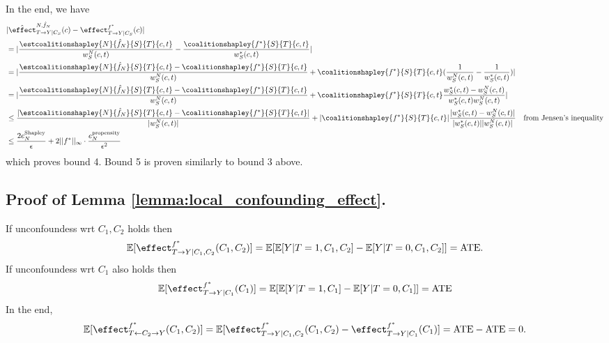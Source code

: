 In the end, we have
\begin{align*}
   &|\hat{\effect}^{N,\hat{f}_N}_{ T \rightarrow Y | C_S}(c)  - \effect^{f^*}_{ T \rightarrow Y | C_S}(c)|\\
   &=  | \frac{\estcoalitionshapley{N}{\hat{f}_N}{S}{T}{c,t}}{w^N_S(c,t)} - \frac{\coalitionshapley{f^*}{S}{T}{c,t}}{w^*_S(c,t)} | \\
   &= | \frac{\estcoalitionshapley{N}{\hat{f}_N}{S}{T}{c,t} - \coalitionshapley{f^*}{S}{T}{c,t}}{w^N_S(c,t)} + \coalitionshapley{f^*}{S}{T}{c,t}(\frac{1}{w^N_S(c,t)}-\frac{1}{w^*_S(c,t)}) | \\
    &= | \frac{\estcoalitionshapley{N}{\hat{f}_N}{S}{T}{c,t} - \coalitionshapley{f^*}{S}{T}{c,t}}{w^N_S(c,t)} + \coalitionshapley{f^*}{S}{T}{c,t}\frac{w^*_S(c,t) - w^N_S(c,t)}{w^*_S(c,t) w^N_S(c,t)} | \\
    &\leq \frac{|\estcoalitionshapley{N}{\hat{f}_N}{S}{T}{c,t} - \coalitionshapley{f^*}{S}{T}{c,t}|}{|w^N_S(c,t)|} + |\coalitionshapley{f^*}{S}{T}{c,t}|\frac{|w^*_S(c,t) - w^N_S(c,t)|}{|w^*_S(c,t)| |w^N_S(c,t)|}  \ \  \ \text{from Jensen's inequality} \\
    &\leq \frac{2e^\text{Shapley}_N}{\epsilon} + 2||f^*||_\infty \cdot \frac{e^\text{propensity}_N}{\epsilon^2}
\end{align*}
which proves bound 4. Bound 5 is proven similarly to bound 3 above.



\subsection{Proof of Lemma \ref{lemma:local_confounding_effect}.}

\label{proof:local_confounding_effect}
If unconfoundess wrt $C_1, C_2$ holds then
\begin{align*}
    \mathbb{E}[\effect^{f^*}_{T \rightarrow Y | C_1, C_2}(C_1, C_2)] = \mathbb{E}[\mathbb{E}[Y|T=1,C_1,C_2] - \mathbb{E}[Y|T=0,C_1,C_2]] = \text{ATE}.
\end{align*}
If unconfoundess wrt $C_1$ also holds then
\begin{align*}
    \mathbb{E}[\effect^{f^*}_{T \rightarrow Y | C_1}(C_1)] = \mathbb{E}[\mathbb{E}[Y|T=1,C_1] - \mathbb{E}[Y|T=0,C_1]] = \text{ATE}
\end{align*}
In the end,
\begin{align*}
    \mathbb{E}[\effect^{f^*}_{T \leftarrow C_2 \rightarrow Y}(C_1,C_2)] = \mathbb{E}[\effect^{f^*}_{T \rightarrow Y | C_1, C_2}(C_1, C_2) - \effect^{f^*}_{T \rightarrow Y | C_1}(C_1)] = \text{ATE} - \text{ATE} = 0.
 \end{align*}
 
